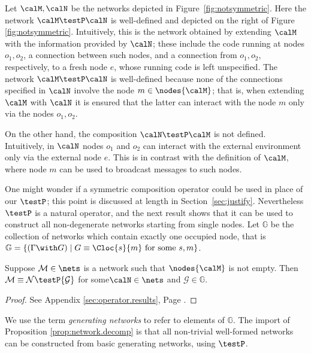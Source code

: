 \documentclass{LMCS}
\begin{document}
\begin{exa}
\label{ex:notsymmetric}
Let $\calM, \calN$ be the networks depicted in Figure~\ref{fig:notsymmetric}. 
Here the network $\calM \testP \calN$ is well-defined and 
depicted on the right of Figure \ref{fig:notsymmetric}. Intuitively, this is 
the network obtained by extending $\calM$ with the information provided 
by $\calN$; these include the code running at nodes $o_1, o_2$, a connection 
between such nodes, and a connection from $o_1, o_2$, respectively, to a 
fresh node $e$, whose running code is left unspecified. 
The network $\calM \testP \calN$ is well-defined because 
none of the connections specified in $\calN$ involve the node $m \in \nodes{\calM}$; that is, when extending $\calM$ with $\calN$ it is ensured 
that the latter can interact with the node $m$ only via the nodes $o_1,o_2$. 

On the other hand, the composition $\calN \testP \calM$ is not defined. Intuitively,  
in $\calN$ nodes $o_1$ and $o_2$ can interact with the external environment only 
via the external node $e$. This is in contrast 
with  the definition of $\calM$, where node $m$ can be used to broadcast messages 
to such nodes.
\end{exa}

One might wonder if a symmetric composition operator could be used in place of our 
$\testP$; this point is discussed at length in Section~\ref{sec:justify}.
Nevertheless $\testP$ is a natural operator, and the next result shows that it can be
used to construct all non-degenerate networks starting from single nodes. 
Let $\mathbb{G}$ be the collection of networks which contain exactly one occupied node, 
that is $\mathbb{G} = \{(\Gamma \with G) \;|\; G \equiv \Cloc{s}{m} \mbox{ for some } s, m\}$. 


\begin{prop}\label{prop:network.decomp}
  Suppose ${\mathcal M}\in \nets$ is a network such that 
  $\nodes{\calM}$ is not empty.  Then ${\mathcal M} \equiv {\mathcal N} \testP
    {\mathcal G}$ for some$\calN \in \nets$ and ${\mathcal G} \in \mathbb{G}$.
\end{prop}
\begin{proof}
See Appendix \ref{sec:operator.results}, Page \pageref{proof:generators}.
\end{proof}
\noindent 
We use the term \emph{generating networks} to refer to elements of $\mathbb{G}$. 
The import of Proposition \ref{prop:network.decomp} is that all 
non-trivial well-formed networks can be constructed from basic generating 
networks, using $\testP$. 
\end{document}
